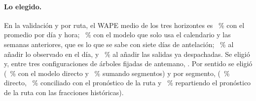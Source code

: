 \paragraph{Lo elegido.} En la validación y por ruta, el WAPE medio de los tres horizontes es \CPValRutaProm~\% con el
promedio por día y hora; \CPValRutaSemanal~\% con el modelo que solo usa el calendario y las semanas anteriores, que es
lo que se sabe con siete días de antelación; \CPValRutaConHoy~\% al añadir lo observado en el día, y
\CPValRutaCompleto~\% al añadir las salidas ya despachadas. Se eligió \CPEligeConjuntos{} y, entre tres
configuraciones de árboles fijadas de antemano, \CPEligeHiper. Por sentido se eligió \CPEligeSentEstructura{}
(\CPValSentDirecto~\% con el modelo directo y \CPValSentSuma~\% sumando segmentos) y por segmento,
\CPEligeSegEstructura{} (\CPValSegDirecto~\% directo, \CPValSegConciliado~\% conciliado con el pronóstico de la ruta y
\CPValSegReparto~\% repartiendo el pronóstico de la ruta con las fracciones históricas).

